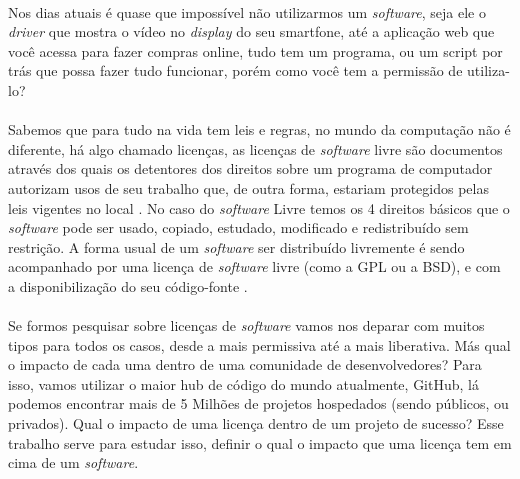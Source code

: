 \paragraph{}
Nos dias atuais é quase que impossível não utilizarmos um \textit{software}, seja ele o \textit{driver} que mostra o vídeo no \textit{display} do seu smartfone,
até a aplicação web que você acessa para fazer compras online, tudo tem um programa, ou um script por trás que possa fazer tudo funcionar,
porém como você tem a permissão de utiliza-lo?

\paragraph{}
Sabemos que para tudo na vida tem leis e regras, no mundo da computação não é diferente, há algo chamado licenças,
as licenças de \textit{software} livre são documentos através dos quais os detentores dos direitos sobre um programa de computador
autorizam usos de seu trabalho que, de outra forma, estariam protegidos pelas leis vigentes no local \cite{sabino2009licenccas}.
No caso do \textit{software} Livre temos os 4 direitos básicos que o \textit{software} pode ser usado, copiado, estudado, modificado e redistribuído
sem restrição. A forma usual de um \textit{software} ser distribuído livremente é sendo acompanhado por uma licença de \textit{software} livre
(como a GPL ou a BSD), e com a disponibilização do seu código-fonte \cite{campos2006software}.

\paragraph{}
Se formos pesquisar sobre licenças de \textit{software} vamos nos deparar com muitos tipos para todos os casos, desde a mais permissiva
até a mais liberativa. Más qual o impacto de cada uma dentro de uma comunidade de desenvolvedores? Para isso, vamos utilizar
o maior hub de código do mundo atualmente, GitHub, lá podemos encontrar mais de 5 Milhões de projetos hospedados
(sendo públicos, ou privados). Qual o impacto de uma licença dentro de um projeto de sucesso? Esse trabalho serve para
estudar isso, definir o qual o impacto que uma licença tem em cima de um \textit{software}.